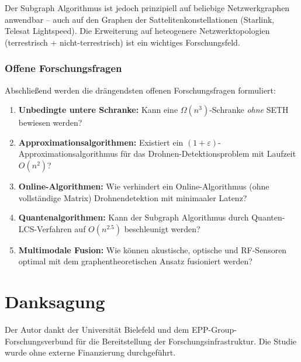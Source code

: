 ﻿\documentclass[a4paper,12pt]{article}
\theoremstyle{definition}
\begin{document}
Der Subgraph Algorithmus ist jedoch prinzipiell auf beliebige Netzwerkgraphen
anwendbar -- auch auf den Graphen der Sattelitenkonstellationen (Starlink,
Telesat Lightspeed). Die Erweiterung auf heteogenere Netzwerktopologien
(terrestrisch + nicht-terrestrisch) ist ein wichtiges Forschungsfeld.

\subsubsection{Offene Forschungsfragen}

Abschlie\ss{}end werden die dr\"angendsten offenen Forschungsfragen
formuliert:

\begin{enumerate}
    \item \textbf{Unbedingte untere Schranke:} Kann eine
          $\Omega(n^3)$-Schranke \emph{ohne} SETH bewiesen werden?
    \item \textbf{Approximationsalgorithmen:} Existiert ein $(1+\varepsilon)$-
          Approximationsalgorithmus f\"ur das Drohnen-Detektionsproblem
          mit Laufzeit $O(n^2)$?
    \item \textbf{Online-Algorithmen:} Wie verhindert ein Online-Algorithmus
          (ohne vollst\"andige Matrix) Drohnendetektion mit minimaaler Latenz?
    \item \textbf{Quantenalgorithmen:} Kann der Subgraph Algorithmus durch
          Quanten-LCS-Verfahren auf $O(n^{2.5})$ beschleunigt werden?
    \item \textbf{Multimodale Fusion:} Wie k\"onnen akustische, optische
          und RF-Sensoren optimal mit dem graphentheoretischen Ansatz fusioniert werden?
\end{enumerate}

\section*{Danksagung}

Der Autor dankt der Universit\"at Bielefeld und dem EPP-Group-Forschungsverbund
f\"ur die Bereitstellung der Forschungsinfrastruktur. Die Studie wurde ohne
externe Finanzierung durchgef\"uhrt.
\end{document}
